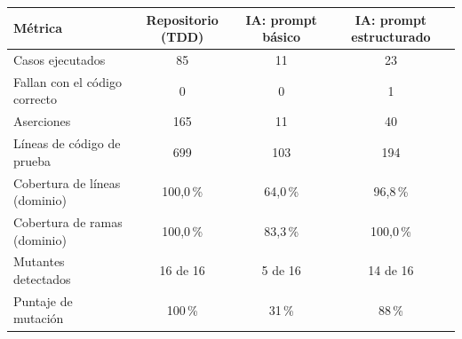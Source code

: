 \begin{tabular}{lccc}
\toprule
Métrica & \textbf{Repositorio (TDD)} & \textbf{IA: prompt básico} & \textbf{IA: prompt estructurado} \\
\midrule
Casos ejecutados & 85 & 11 & 23 \\
Fallan con el código correcto & 0 & 0 & 1 \\
Aserciones & 165 & 11 & 40 \\
Líneas de código de prueba & 699 & 103 & 194 \\
Cobertura de líneas (dominio) & 100,0\,\% & 64,0\,\% & 96,8\,\% \\
Cobertura de ramas (dominio) & 100,0\,\% & 83,3\,\% & 100,0\,\% \\
Mutantes detectados & 16 de 16 & 5 de 16 & 14 de 16 \\
Puntaje de mutación & 100\,\% & 31\,\% & 88\,\% \\
\bottomrule
\end{tabular}
